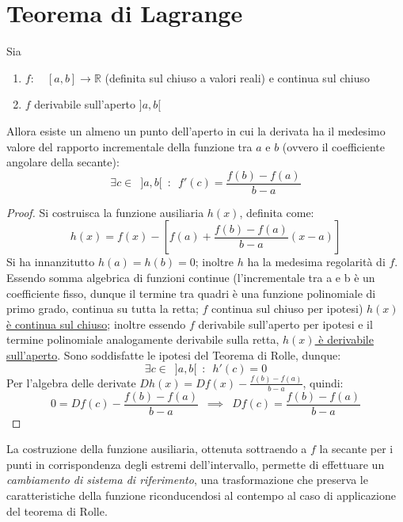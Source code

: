 \documentclass[10pt, oneside]{book}
\theoremstyle{plain}
\begin{document}
\section{Teorema di Lagrange}
\begin{ther}[\textbf{T. di L.}]
Sia \begin{enumerate}
    \item $f: \enspace \enspace [a, b] \rightarrow \mathbb{R}$ (definita sul chiuso a valori reali) e continua sul chiuso
    \item $f$ derivabile sull'aperto $]a, b[$
\end{enumerate}
Allora esiste un almeno un punto dell'aperto in cui la derivata ha il medesimo valore del rapporto incrementale della funzione tra $a$ e $b$ (ovvero il coefficiente angolare della secante):
\[\exists c \in \enspace ]a, b[ \enspace : \enspace f'(c) = \frac{f(b) - f(a)}{b - a}\]
\end{ther}
\begin{proof}
Si costruisca la funzione ausiliaria $h(x)$, definita come:
\[h(x) = f(x) - [f(a) + \frac{f(b) - f(a)}{b - a}(x - a)]\]
Si ha innanzitutto $h(a) = h(b) = 0$; inoltre $h$ ha la medesima regolarità di $f$. Essendo somma algebrica di funzioni continue (l'incrementale tra a e b è un coefficiente fisso, dunque il termine tra quadri è una funzione polinomiale di primo grado, continua su tutta la retta; $f$ continua sul chiuso per ipotesi) \underline{$h(x)$ è continua sul chiuso}; inoltre essendo $f$ derivabile sull'aperto per ipotesi e il termine polinomiale analogamente derivabile sulla retta, \underline{$h(x)$ è derivabile sull'aperto}. Sono soddisfatte le ipotesi del Teorema di Rolle, dunque:
\[\exists c \in \enspace]a, b[\enspace : \enspace h'(c) = 0\]
Per l'algebra delle derivate $D h(x) = D f (x) - \frac{f(b) - f(a)}{b - a}$, quindi:
\[0 = D f (c) - \frac{f(b) - f(a)}{b - a} \enspace \implies \enspace D f (c) = \frac{f(b) - f(a)}{b - a}\]
\end{proof}
\begin{oss}
La costruzione della funzione ausiliaria, ottenuta sottraendo a $f$ la secante per i punti in corrispondenza degli estremi dell'intervallo, permette di effettuare un \textit{cambiamento di sistema di riferimento}, una trasformazione che preserva le caratteristiche della funzione riconducendosi al contempo al caso di applicazione del teorema di Rolle.
\end{oss}
\end{document}
